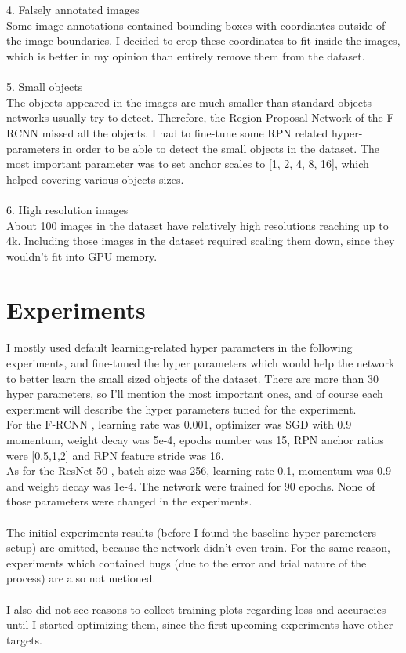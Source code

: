 \documentclass[]{article}
\begin{document}
\\\\
4. Falsely annotated images\\
Some image annotations contained bounding boxes with coordiantes outside of the image boundaries. I decided to crop these coordinates to fit inside the images, which is better in my opinion than entirely remove them from the dataset.
\\\\
5. Small objects\\
The objects appeared in the images are much smaller than standard objects networks usually try to detect. Therefore, the Region Proposal Network of the F-RCNN \cite{fasterrcnn} missed all the objects. I had to fine-tune some RPN related hyper-parameters in order to be able to detect the small objects in the dataset. The most important parameter was to set anchor scales to [1, 2, 4, 8, 16], which helped covering various objects sizes.
\\\\
6. High resolution images\\
About 100 images in the dataset have relatively high resolutions reaching up to 4k. Including those images in the dataset required scaling them down, since they wouldn't fit into GPU memory.

\section{Experiments}
I mostly used default learning-related hyper parameters in the following experiments, and fine-tuned the hyper parameters which would help the network to better learn the small sized objects of the dataset. There are more than 30 hyper parameters, so I'll mention the most important ones, and of course each experiment will describe the hyper parameters tuned for the experiment.\\
For the F-RCNN \cite{fasterrcnn}, learning rate was 0.001, optimizer was SGD with 0.9 momentum, weight decay was 5e-4, epochs number was 15, RPN anchor ratios were [0.5,1,2] and RPN feature stride was 16.\\
As for the ResNet-50 \cite{resnet}, batch size was 256, learning rate 0.1, momentum was 0.9 and weight decay was 1e-4. The network were trained for 90 epochs. None of those parameters were changed in the experiments.
\\\\
The initial experiments results (before I found the baseline hyper paremeters setup) are omitted, because the network didn't even train. For the same reason, experiments which contained bugs (due to the error and trial nature of the process) are also not metioned.
\\\\
I also did not see reasons to collect training plots regarding loss and accuracies until I started optimizing them, since the first upcoming experiments have other targets.
\end{document}
